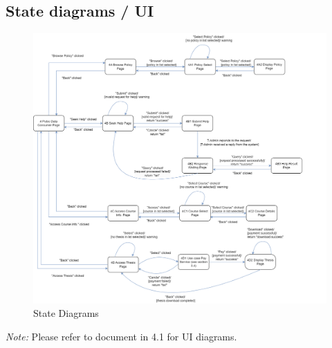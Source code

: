 \subsection{State diagrams / UI}
\begin{figure}[H]
    \centering
    \includegraphics[width=0.75\linewidth]{picture/WechatIMG297.jpg}
    \caption{State Diagrams}
    \label{fig:enter-label}
\end{figure}

\textit{Note:} Please refer to document in 4.1 for UI diagrams.

